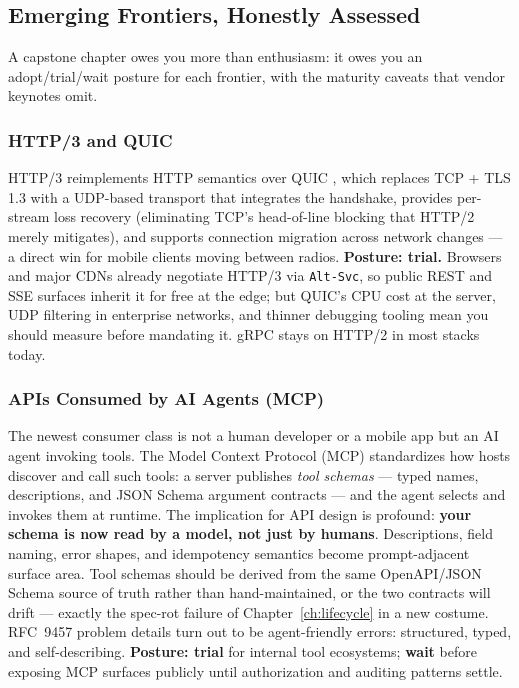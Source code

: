 \subsection{Emerging Frontiers, Honestly Assessed}
\label{sec:frontiers}

A capstone chapter owes you more than enthusiasm: it owes you an
adopt/trial/wait posture for each frontier, with the maturity caveats that
vendor keynotes omit.

\subsubsection{HTTP/3 and QUIC}

HTTP/3 \cite{rfc9114} reimplements HTTP semantics over QUIC \cite{rfc9000},
which replaces TCP + TLS 1.3 \cite{rfc8446} with a UDP-based transport that
integrates the handshake, provides per-stream loss recovery (eliminating
TCP's head-of-line blocking that HTTP/2 \cite{rfc9113,rfc7541} merely
mitigates), and supports connection migration across network changes ---
a direct win for mobile clients moving between radios. \textbf{Posture:
trial.} Browsers and major CDNs already negotiate HTTP/3 via
\texttt{Alt-Svc}, so public REST and SSE surfaces inherit it for free at the
edge; but QUIC's CPU cost at the server, UDP filtering in enterprise
networks, and thinner debugging tooling mean you should measure before
mandating it. gRPC stays on HTTP/2 in most stacks today.

\subsubsection{APIs Consumed by AI Agents (MCP)}

The newest consumer class is not a human developer or a mobile app but an AI
agent invoking tools. The Model Context Protocol (MCP) standardizes how hosts
discover and call such tools: a server publishes \emph{tool schemas} ---
typed names, descriptions, and JSON Schema argument contracts
\cite{jsonschemadocs} --- and the agent selects and invokes them at runtime.
The implication for API design is profound: \textbf{your schema is now read
by a model, not just by humans}. Descriptions, field naming, error shapes,
and idempotency semantics become prompt-adjacent surface area. Tool schemas
should be derived from the same OpenAPI/JSON Schema source of truth
\cite{openapi31} rather than hand-maintained, or the two contracts will
drift --- exactly the spec-rot failure of Chapter~\ref{ch:lifecycle} in a new
costume. RFC~9457 problem details \cite{rfc9457} turn out to be
agent-friendly errors: structured, typed, and self-describing.
\textbf{Posture: trial} for internal tool ecosystems; \textbf{wait} before
exposing MCP surfaces publicly until authorization and auditing patterns
settle.

